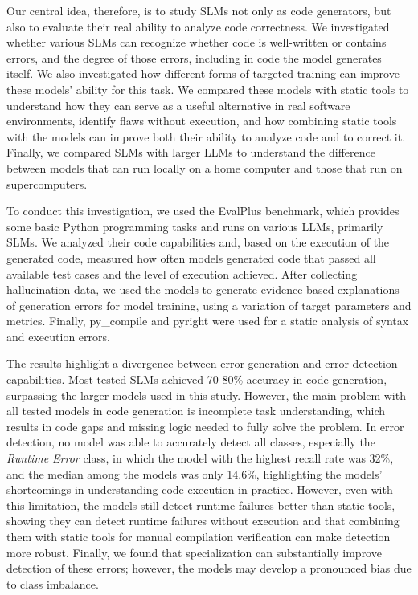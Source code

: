 Our central idea, therefore, is to study SLMs not only as code generators, but also to evaluate their real ability to analyze code correctness. We investigated whether various SLMs can recognize whether code is well-written or contains errors, and the degree of those errors, including in code the model generates itself. We also investigated how different forms of targeted training can improve these models' ability for this task. We compared these models with static tools to understand how they can serve as a useful alternative in real software environments, identify flaws without execution, and how combining static tools with the models can improve both their ability to analyze code and to correct it. Finally, we compared SLMs with larger LLMs to understand the difference between models that can run locally on a home computer and those that run on supercomputers.

To conduct this investigation, we used the EvalPlus benchmark, which provides some basic Python programming tasks and runs on various LLMs, primarily SLMs. We analyzed their code capabilities and, based on the execution of the generated code, measured how often models generated code that passed all available test cases and the level of execution achieved. After collecting hallucination data, we used the models to generate evidence-based explanations of generation errors for model training, using a variation of target parameters and metrics. Finally, py\_compile and pyright were used for a static analysis of syntax and execution errors.

The results highlight a divergence between error generation and error-detection capabilities. Most tested SLMs achieved 70-80\% accuracy in code generation, surpassing the larger models used in this study. However, the main problem with all tested models in code generation is incomplete task understanding, which results in code gaps and missing logic needed to fully solve the problem. In error detection, no model was able to accurately detect all classes, especially the \emph{Runtime Error} class, in which the model with the highest recall rate was 32\%, and the median among the models was only 14.6\%, highlighting the models' shortcomings in understanding code execution in practice. However, even with this limitation, the models still detect runtime failures better than static tools, showing they can detect runtime failures without execution and that combining them with static tools for manual compilation verification can make detection more robust. Finally, we found that specialization can substantially improve detection of these errors; however, the models may develop a pronounced bias due to class imbalance.

